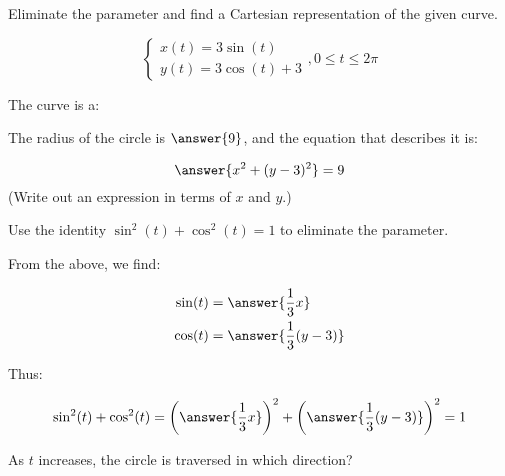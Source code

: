 \documentclass{ximera}
\author{Jim Talamo and Nick Hemleben}
\begin{document}
\begin{exercise}
Eliminate the parameter and find a Cartesian representation of the given curve.

\[
\begin{cases}
x(t) =  3 \sin (t) \\
y(t) =  3 \cos(t)+3
\end{cases}
, 0 \leq t \leq 2\pi
\]

The curve is a:

\begin{multipleChoice}
\end{multipleChoice}

The radius of the circle is $\answer{9}$, and the equation that describes it is:

\[
 \answer{ x^2 + (y-3)^2 } = 9
\]
(Write out an expression in terms of $x$ and $y$.)
\begin{hint}
Use the identity $\sin^2(t)+\cos^2(t) =1$ to eliminate the parameter.  

From the above, we find:

\begin{align*}
\sin(t) &= \answer{\frac{1}{3}x} \\ 
\cos(t) &= \answer{\frac{1}{3}(y-3)}
\end{align*}

Thus:

\[
\sin^2(t) + \cos^2(t) = \left(\answer{\frac{1}{3}x}\right)^2+ \left(\answer{\frac{1}{3}(y-3)}\right)^2 =1
\]
\end{hint}

As $t$ increases, the circle is traversed in which direction?
\begin{multipleChoice}
\end{multipleChoice}
\end{exercise}
\end{document}
